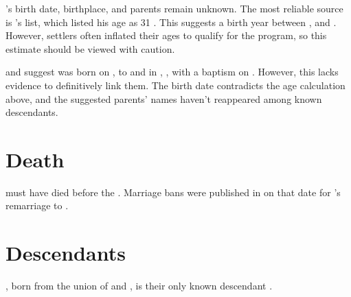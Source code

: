 \mcdonaldJNameOnly{}'s birth date, birthplace, and parents remain unknown. The most reliable source is \biggarASurname{}'s \settler{} list, which listed his age as 31 \autocite[536-539]{eggsa:biggarCorrespondance}. This suggests a birth year between , and . However, settlers often inflated their ages to qualify for the program, so this estimate should be viewed with caution.

\citeauthor{FS:JamesMcDonaldBaptism} and \citeauthor{settlers:JamesMcDonald} suggest \mcdonaldJName{} was born on , to \mcdonaldWWFullNames{} and \aitchisonJFullNames{} in \crawfordFull{}, \scotland{}, with a baptism on  \autocite{FS:JamesMcDonaldBaptism} \autocite{settlers:JamesMcDonald}. However, this lacks evidence to definitively link them. The birth date contradicts the age calculation above, and the suggested parents' names haven't reappeared among known descendants.

\section[Death]{Death}
\label{sec: Death}

\mcdonaldJNameOnly{} must have died before the . Marriage bans were published in \grahamstown{} on that date for \welchMName{}'s remarriage to \henmanRName{} \autocite{settlers:JamesMcDonald} \autocite{settlers:MaryWelch}.

\section[Descendants]{Descendants}
\label{sec: Descendants}

\mcdonaldAName{}, born from the union of \mcdonaldJName{} and \welchMName{}, is their only known descendant \autocite[46]{nash:1820}.